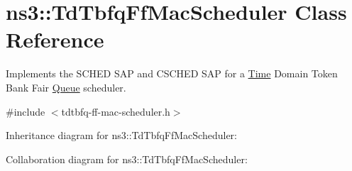 \hypertarget{classns3_1_1TdTbfqFfMacScheduler}{}\section{ns3\+:\+:Td\+Tbfq\+Ff\+Mac\+Scheduler Class Reference}
\label{classns3_1_1TdTbfqFfMacScheduler}


Implements the S\+C\+H\+ED S\+AP and C\+S\+C\+H\+ED S\+AP for a \hyperlink{classns3_1_1Time}{Time} Domain Token Bank Fair \hyperlink{classns3_1_1Queue}{Queue} scheduler.  




{\ttfamily \#include $<$tdtbfq-\/ff-\/mac-\/scheduler.\+h$>$}



Inheritance diagram for ns3\+:\+:Td\+Tbfq\+Ff\+Mac\+Scheduler\+:


Collaboration diagram for ns3\+:\+:Td\+Tbfq\+Ff\+Mac\+Scheduler\+:
